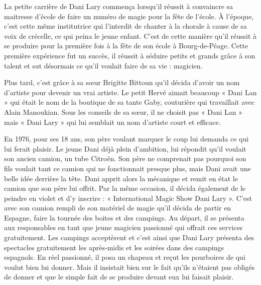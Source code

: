 La petite carrière de Dani Lary commença lorsqu’il réussit à convaincre sa maitresse d’école de faire un numéro de magie pour la fête de l’école. À l’époque, c’est cette même institutrice qui l’interdit de chanter à la chorale à cause de sa voix de crécelle, ce qui peina le jeune enfant. C’est de cette manière qu’il réussit à se produire pour la première fois à la fête de son école à Bourg-de-Péage. Cette première expérience fut un succès, il réussit à séduire petits et grands grâce à son talent et sut désormais ce qu'il voulait faire de sa vie : magicien.  

Plus tard, c'est grâce à sa sœur Brigitte Bittoun qu’il décida d’avoir un nom d’artiste pour devenir un vrai artiste. Le petit Hervé aimait beaucoup « Dani Lan » qui était le nom de la boutique de sa tante Gaby, couturière qui travaillait avec Alain Manoukian. Sous les conseils de sa sœur, il ne choisit pas « Dani Lan » mais « Dani Lary » qui lui semblait un nom d’artiste court et efficace. 

En 1976, pour ses 18 ans, son père voulant marquer le coup lui demanda ce qui lui ferait plaisir. Le jeune Dani déjà plein d’ambition, lui répondit qu’il voulait son ancien camion, un tube Citroën. Son père ne comprenait pas pourquoi son fils voulait tant ce camion qui ne fonctionnait presque plus, mais Dani avait une belle idée derrière la tête. Dani apprit alors la mécanique et remit en état le camion que son père lui offrit. Par la même occasion, il décida également de le peindre en violet et d’y inscrire : « International Magic Show Dani Lary ». C’est avec son camion rempli de son matériel de magie qu’il décida de partir en Espagne, faire la tournée des boites et des campings. Au départ, il se présenta aux responsables en tant que jeune magicien passionné qui offrait ces services gratuitement. Les campings acceptèrent et c’est ainsi que Dani Lary présenta des spectacles gratuitement les après-midis et les soirées dans des campings espagnols. En réel passionné, il posa un chapeau et reçut les pourboires de qui voulut bien lui donner. Mais il insistait bien sur le fait qu’ils n’étaient pas obligés de donner et que le simple fait de se produire devant eux lui faisait plaisir. 

